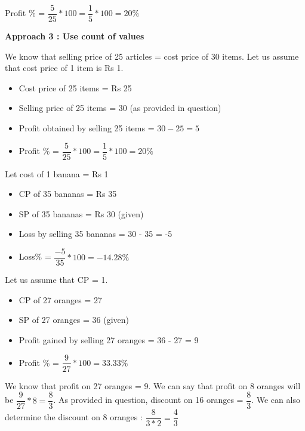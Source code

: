 Profit \% = $\dfrac{5}{25} * 100 = \dfrac{1}{5} * 100 = 20\%$

\textbf{Approach 3 : Use count of values}

We know that selling price of 25 articles = cost price of 30 items. Let us assume that cost price of 1 item is Rs 1. 

\begin{itemize}
    \item Cost price of 25 items = Rs 25
    \item Selling price of 25 items = 30 (as provided in question)
    \item Profit obtained by selling 25 items = $30 - 25 = 5$
    \item Profit \% = $\dfrac{5}{25} * 100 = \dfrac{1}{5} * 100 = 20\%$
\end{itemize}


Let cost of 1 banana = Rs 1
\begin{itemize}
    \item CP of 35 bananas = Rs 35
    \item SP of 35 bananas = Rs 30 (given)
    \item Loss by selling 35 bananas = 30 - 35 = -5
    \item Loss\% = $\dfrac{-5}{35} * 100 = -14.28\%$
    
\end{itemize}


Let us assume that CP = 1. 
\begin{itemize}
    \item CP of 27 oranges = 27
    \item SP of 27 oranges = 36 (given)
    \item Profit gained by selling 27 oranges = 36 - 27 = 9
    \item Profit \% = $\dfrac{9}{27} * 100= 33.33\%$
\end{itemize}

We know that profit on 27 oranges = 9. We can say that profit on 8 oranges will be $\dfrac{9}{27} * 8 = \dfrac{8}{3}$. As provided in question, discount on 16 oranges = $\dfrac{8}{3}$. We can also determine the discount on 8 oranges : $\dfrac{8}{3 * 2} = \dfrac{4}{3}$

